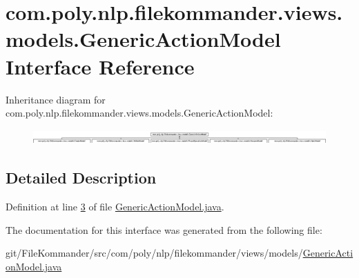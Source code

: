 \hypertarget{interfacecom_1_1poly_1_1nlp_1_1filekommander_1_1views_1_1models_1_1_generic_action_model}{\section{com.\-poly.\-nlp.\-filekommander.\-views.\-models.\-Generic\-Action\-Model Interface Reference}
\label{interfacecom_1_1poly_1_1nlp_1_1filekommander_1_1views_1_1models_1_1_generic_action_model}
}
Inheritance diagram for com.\-poly.\-nlp.\-filekommander.\-views.\-models.\-Generic\-Action\-Model\-:\begin{figure}[H]
\begin{center}
\leavevmode
\includegraphics[height=0.572890cm]{interfacecom_1_1poly_1_1nlp_1_1filekommander_1_1views_1_1models_1_1_generic_action_model}
\end{center}
\end{figure}


\subsection{Detailed Description}


Definition at line \hyperlink{L3}{3} of file \hyperlink{}{Generic\-Action\-Model.\-java}.



The documentation for this interface was generated from the following file\-:\begin{DoxyCompactItemize}
\item 
git/\-File\-Kommander/src/com/poly/nlp/filekommander/views/models/\hyperlink{_generic_action_model_8java}{Generic\-Action\-Model.\-java}\end{DoxyCompactItemize}
